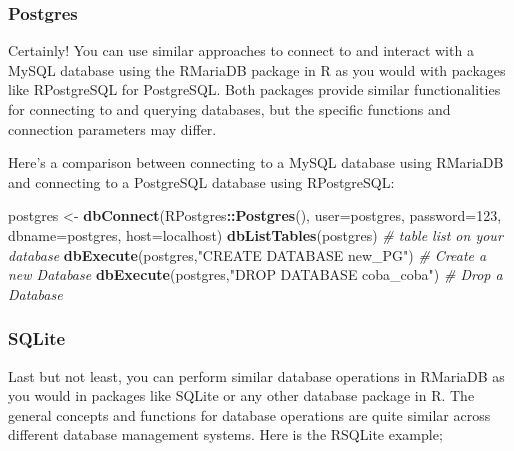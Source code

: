 \documentclass[
]{book}
\newenvironment{Shaded}{\begin{snugshade}}{\end{snugshade}}
\newcommand{\AttributeTok}[1]{\textcolor[rgb]{0.13,0.29,0.53}{#1}}
\newcommand{\CommentTok}[1]{\textcolor[rgb]{0.56,0.35,0.01}{\textit{#1}}}
\newcommand{\FunctionTok}[1]{\textcolor[rgb]{0.13,0.29,0.53}{\textbf{#1}}}
\newcommand{\NormalTok}[1]{#1}
\newcommand{\OtherTok}[1]{\textcolor[rgb]{0.56,0.35,0.01}{#1}}
\newcommand{\SpecialCharTok}[1]{\textcolor[rgb]{0.81,0.36,0.00}{\textbf{#1}}}
\newcommand{\StringTok}[1]{\textcolor[rgb]{0.31,0.60,0.02}{#1}}
\begin{document}
\hypertarget{postgres}{%
\subsubsection*{Postgres}\label{postgres}}

Certainly! You can use similar approaches to connect to and interact with a MySQL database using the RMariaDB package in R as you would with packages like RPostgreSQL for PostgreSQL. Both packages provide similar functionalities for connecting to and querying databases, but the specific functions and connection parameters may differ.

Here's a comparison between connecting to a MySQL database using RMariaDB and connecting to a PostgreSQL database using RPostgreSQL:

\begin{Shaded}
\begin{Highlighting}[]
\NormalTok{postgres }\OtherTok{\textless{}{-}} \FunctionTok{dbConnect}\NormalTok{(RPostgres}\SpecialCharTok{::}\FunctionTok{Postgres}\NormalTok{(), }
                  \AttributeTok{user=}\StringTok{\textquotesingle{}postgres\textquotesingle{}}\NormalTok{,}
                  \AttributeTok{password=}\StringTok{\textquotesingle{}123\textquotesingle{}}\NormalTok{, }
                  \AttributeTok{dbname=}\StringTok{\textquotesingle{}postgres\textquotesingle{}}\NormalTok{, }
                  \AttributeTok{host=}\StringTok{\textquotesingle{}localhost\textquotesingle{}}\NormalTok{)}
\FunctionTok{dbListTables}\NormalTok{(postgres)                            }\CommentTok{\# table list on your database}
\FunctionTok{dbExecute}\NormalTok{(postgres,}\StringTok{"CREATE DATABASE new\_PG"}\NormalTok{)      }\CommentTok{\# Create a new Database}
\FunctionTok{dbExecute}\NormalTok{(postgres,}\StringTok{"DROP DATABASE coba\_coba"}\NormalTok{)     }\CommentTok{\# Drop a Database}
\end{Highlighting}
\end{Shaded}

\hypertarget{sqlite}{%
\subsubsection*{SQLite}\label{sqlite}}

Last but not least, you can perform similar database operations in RMariaDB as you would in packages like SQLite or any other database package in R. The general concepts and functions for database operations are quite similar across different database management systems. Here is the RSQLite example;
\end{document}
